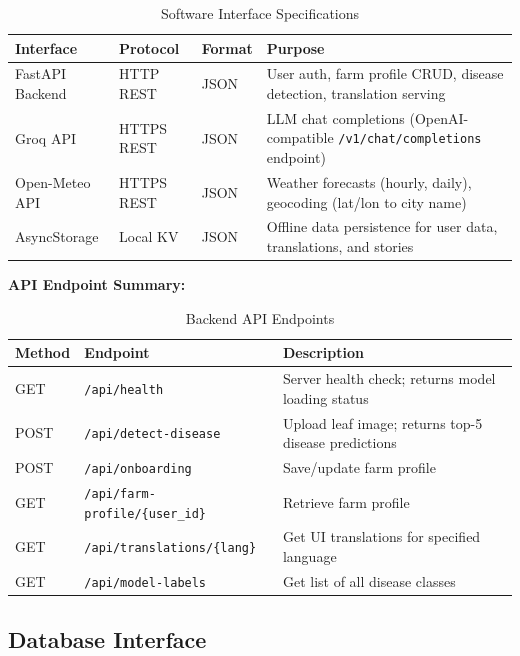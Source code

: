 \documentclass[12pt,a4paper]{article}
\newcommand{\tablefont}{\fontsize{10}{12}\selectfont}
\begin{document}
\begin{table}[H]
\centering
\tablefont
\begin{tabular}{|p{3cm}|p{2.5cm}|p{2cm}|p{4.5cm}|}
\hline
\textbf{Interface} & \textbf{Protocol} & \textbf{Format} & \textbf{Purpose} \\
\hline
FastAPI Backend & HTTP REST & JSON & User auth, farm profile CRUD, disease detection, translation serving \\
\hline
Groq API & HTTPS REST & JSON & LLM chat completions (OpenAI-compatible \texttt{/v1/chat/completions} endpoint) \\
\hline
Open-Meteo API & HTTPS REST & JSON & Weather forecasts (hourly, daily), geocoding (lat/lon to city name) \\
\hline
AsyncStorage & Local KV & JSON & Offline data persistence for user data, translations, and stories \\
\hline
\end{tabular}
\caption{Software Interface Specifications}
\end{table}

\textbf{API Endpoint Summary:}
\begin{table}[H]
\centering
\tablefont
\begin{tabular}{|l|l|p{5cm}|}
\hline
\textbf{Method} & \textbf{Endpoint} & \textbf{Description} \\
\hline
GET & \texttt{/api/health} & Server health check; returns model loading status \\
POST & \texttt{/api/detect-disease} & Upload leaf image; returns top-5 disease predictions \\
POST & \texttt{/api/onboarding} & Save/update farm profile \\
GET & \texttt{/api/farm-profile/\{user\_id\}} & Retrieve farm profile \\
GET & \texttt{/api/translations/\{lang\}} & Get UI translations for specified language \\
GET & \texttt{/api/model-labels} & Get list of all disease classes \\
\hline
\end{tabular}
\caption{Backend API Endpoints}
\end{table}

\subsection{Database Interface}
\end{document}
